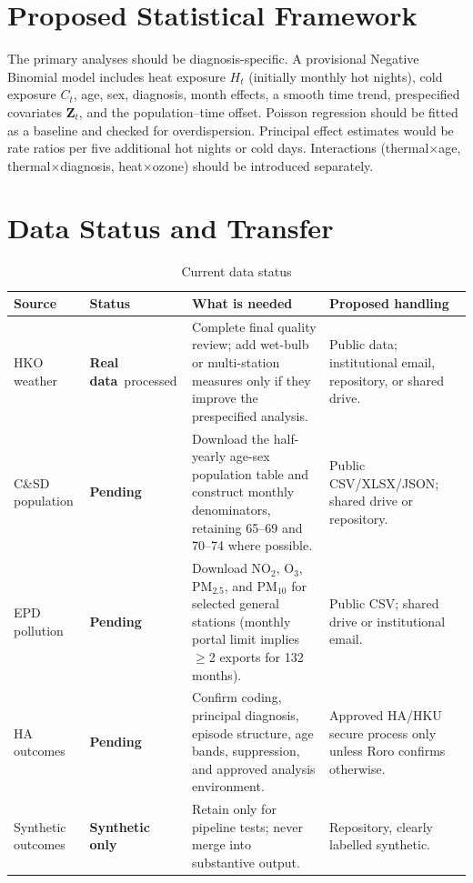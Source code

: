 \documentclass[11pt]{article}
\newcommand{\realdata}{\textcolor{green!40!black}{\textbf{Real data}}}
\newcommand{\synthetic}{\textcolor{orange!75!black}{\textbf{Synthetic only}}}
\newcommand{\pending}{\textcolor{red!65!black}{\textbf{Pending}}}
\begin{document}
\section{Proposed Statistical Framework}

The primary analyses should be diagnosis-specific. A provisional Negative
Binomial model includes heat exposure $H_t$ (initially monthly hot nights),
cold exposure $C_t$, age, sex, diagnosis, month effects, a smooth time trend,
prespecified covariates $\mathbf{Z}_t$, and the population--time offset.
Poisson regression should be fitted as a baseline and checked for
overdispersion. Principal effect estimates would be rate ratios per five
additional hot nights or cold days. Interactions (thermal$\times$age,
thermal$\times$diagnosis, heat$\times$ozone) should be introduced separately.

\section{Data Status and Transfer}

\begin{table}[ht]
\centering
\caption{Current data status}
\small
\begin{tabularx}{\textwidth}{
    >{\raggedright\arraybackslash}p{2.2cm}
    >{\raggedright\arraybackslash}p{2.0cm}
    X
    >{\raggedright\arraybackslash}p{2.6cm}}
\toprule
Source & Status & What is needed & Proposed handling\\
\midrule
HKO weather &
\realdata\ processed &
Complete final quality review; add wet-bulb or multi-station measures only if
they improve the prespecified analysis. &
Public data; institutional email, repository, or shared drive.\\
C\&SD population &
\pending &
Download the half-yearly age-sex population table and construct monthly
denominators, retaining 65--69 and 70--74 where possible. &
Public CSV/XLSX/JSON; shared drive or repository.\\
EPD pollution &
\pending &
Download NO$_2$, O$_3$, PM$_{2.5}$, and PM$_{10}$ for selected general
stations (monthly portal limit implies $\ge$2 exports for 132 months). &
Public CSV; shared drive or institutional email.\\
HA outcomes &
\pending &
Confirm coding, principal diagnosis, episode structure, age bands, suppression,
and approved analysis environment. &
Approved HA/HKU secure process only unless Roro confirms otherwise.\\
Synthetic outcomes &
\synthetic &
Retain only for pipeline tests; never merge into substantive output. &
Repository, clearly labelled synthetic.\\
\bottomrule
\end{tabularx}
\end{table}
\end{document}

